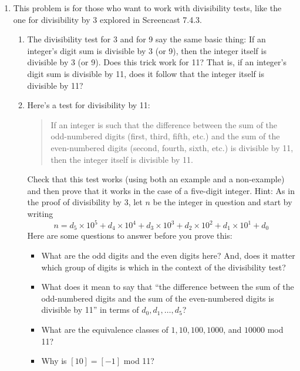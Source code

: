 \documentclass[11pt]{article}
\begin{document}
\begin{enumerate}


		\item This problem is for those who want to work with divisibility tests, like the one for divisibility by 3 explored in Screencast 7.4.3. 
		\begin{enumerate}
			\item The divisibility test for 3 and for 9 say the same basic thing: If an integer's digit sum is divisible by 3 (or 9), then the integer itself is divisible by 3 (or 9). Does this trick work for 11? That is, if an integer's digit sum is divisible by 11, does it follow that the integer itself is divisible by 11? 
			\item Here's a test for divisibility by 11: 
			\begin{quote}
				If an integer is such that the difference between the sum of the odd-numbered digits (first, third, fifth, etc.) and the sum of the even-numbered digits (second, fourth, sixth, etc.) is divisible by 11, then the integer itself is divisible by 11. 
			\end{quote}
			Check that this test works (using both an example and a non-example) and then prove that it works in the case of a five-digit integer. Hint: As in the proof of divisibility by 3, let $n$ be the integer in question and start by writing 
			\[ n = d_5 \times 10^5 + d_4 \times 10^4 + d_3 \times 10^3 + d_2 \times 10^2 + d_1 \times 10^1 + d_0 \]
			Here are some questions to answer before you prove this:
			\begin{itemize}
				\item What are the odd digits and the even digits here? And, does it matter which group of digits is which in the context of the divisibility test? 
				\item What does it mean to say that ``the difference between the sum of the odd-numbered digits and the sum of the even-numbered digits is divisible by 11'' in terms of $d_0, d_1, \dots, d_5$? 
				\item What are the equivalence classes of $1, 10, 100, 1000$, and $10000$ mod 11? 
				\item Why is $[10] = [-1]$ mod 11? 
				
			\end{itemize}
			
			
			
		\end{enumerate}
		

\end{enumerate}
\end{document}
